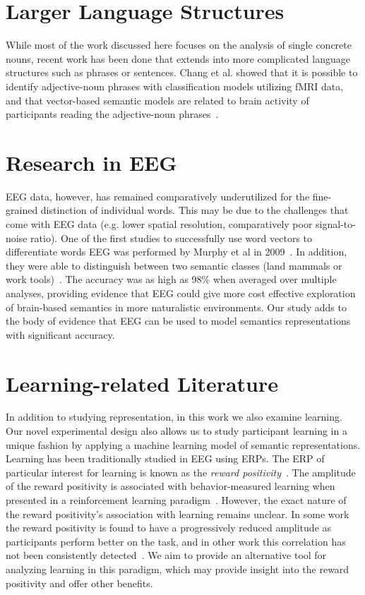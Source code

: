 \section{Larger Language Structures}

While most of the work discussed here focuses on the analysis of single 
concrete nouns, recent work has been done that extends into more complicated 
language structures such as phrases or sentences. Chang et al. showed that it 
is possible to identify adjective-noun phrases with classification models 
utilizing fMRI data, and that vector-based semantic models are related to brain 
activity of participants reading the adjective-noun phrases~\cite{Change2009}.

\section{Research in EEG}

EEG data, however, has remained comparatively underutilized for the 
fine-grained distinction of individual words. This may be due to the challenges 
that come with EEG data (e.g. lower spatial resolution, comparatively poor 
signal-to-noise ratio).  One of the first studies to successfully use word 
vectors to differentiate words EEG was performed by Murphy et al in 
2009~\cite{Murphy2009}.  In addition, they were able to distinguish between two 
semantic classes (land mammals or work tools)~\cite{Murphy2009,Murphy2011}. The 
accuracy was as high as 98\% when averaged over multiple analyses, providing 
evidence that EEG could give more cost effective exploration of brain-based 
semantics in more naturalistic environments.  Our study adds to the body of 
evidence that EEG can be used to model semantics representations with 
significant accuracy.

\section{Learning-related Literature}

In addition to studying representation, in this work we also examine learning. 
Our novel experimental design also allows us to study participant learning in a 
unique fashion by applying a machine learning model of semantic 
representations. Learning has been traditionally studied in EEG using ERPs. The 
ERP of particular interest for learning is known as the \emph{reward 
positivity}~\cite{proudfit2015reward}. The amplitude of the reward positivity 
is associated with behavior-measured learning when presented in a reinforcement 
learning paradigm~\cite{holroyd2002neural, sutton1998reinforcement, 
williams2017application}. However, the exact nature of the reward positivity's 
association with learning remains unclear. In some work the reward positivity 
is found to have a progressively reduced amplitude as participants perform 
better on the task, and in other work this correlation has not been 
consistently detected~\cite{walsh2012learning}. We aim to provide an 
alternative tool for analyzing learning in this paradigm, which may provide 
insight into the reward positivity and offer other benefits.

